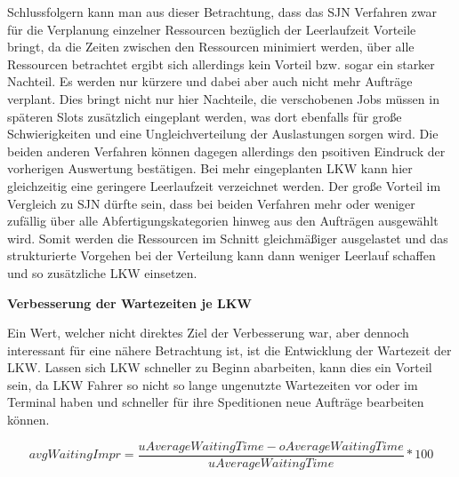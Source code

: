 Schlussfolgern kann man aus dieser Betrachtung, dass das SJN Verfahren zwar für die Verplanung einzelner Ressourcen bezüglich der Leerlaufzeit Vorteile bringt, da die Zeiten zwischen den Ressourcen minimiert werden, über alle Ressourcen betrachtet ergibt sich allerdings kein Vorteil bzw. sogar ein starker Nachteil. Es werden nur kürzere und dabei aber auch nicht mehr Aufträge verplant. Dies bringt nicht nur hier Nachteile, die verschobenen Jobs müssen in späteren Slots zusätzlich eingeplant werden, was dort ebenfalls für große Schwierigkeiten und eine Ungleichverteilung der Auslastungen sorgen wird. Die beiden anderen Verfahren können dagegen allerdings den psoitiven Eindruck der vorherigen Auswertung bestätigen. Bei mehr eingeplanten LKW kann hier gleichzeitig eine geringere Leerlaufzeit verzeichnet werden. Der große Vorteil im Vergleich zu SJN dürfte sein, dass bei beiden Verfahren mehr oder weniger zufällig über alle Abfertigungskategorien hinweg aus den Aufträgen ausgewählt wird. Somit werden die Ressourcen im Schnitt gleichmäßiger ausgelastet und das strukturierte Vorgehen bei der Verteilung kann dann weniger Leerlauf schaffen und so zusätzliche LKW einsetzen.



\textbf{Verbesserung der Wartezeiten je LKW}

Ein Wert, welcher nicht direktes Ziel der Verbesserung war, aber dennoch interessant für eine nähere Betrachtung ist, ist die Entwicklung der Wartezeit der LKW. Lassen sich LKW schneller zu Beginn abarbeiten, kann dies ein Vorteil sein, da LKW Fahrer so nicht so lange ungenutzte Wartezeiten vor oder im Terminal haben und schneller für ihre Speditionen neue Aufträge bearbeiten können.

\begin{equation} \label{eq:avgWaitingImpr}
avgWaitingImpr = \dfrac{uAverageWaitingTime - oAverageWaitingTime}{uAverageWaitingTime} * 100
\end{equation}

